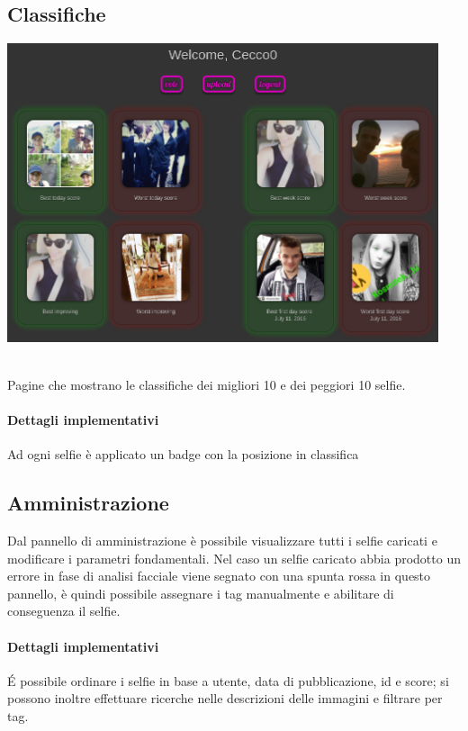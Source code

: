 \documentclass{article}
\begin{document}
\subsection{Classifiche}
\begin{center}\includegraphics[width=0.95\textwidth]{res/panel.png}\end{center}\\
Pagine che mostrano le classifiche dei migliori 10 e dei peggiori 10 selfie.
\paragraph{Dettagli implementativi}
Ad ogni selfie è applicato un badge con la posizione in classifica

\subsection{Amministrazione}
Dal pannello di amministrazione è possibile visualizzare tutti i selfie caricati e modificare i parametri fondamentali.
Nel caso un selfie caricato abbia prodotto un errore in fase di analisi facciale viene segnato con una spunta rossa in questo pannello,
è quindi possibile assegnare i tag manualmente e abilitare di conseguenza il selfie.

\paragraph{Dettagli implementativi}
\'E possibile ordinare i selfie in base a utente, data di pubblicazione, id e score; si possono inoltre effettuare
ricerche nelle descrizioni delle immagini e filtrare per tag.
\end{document}
